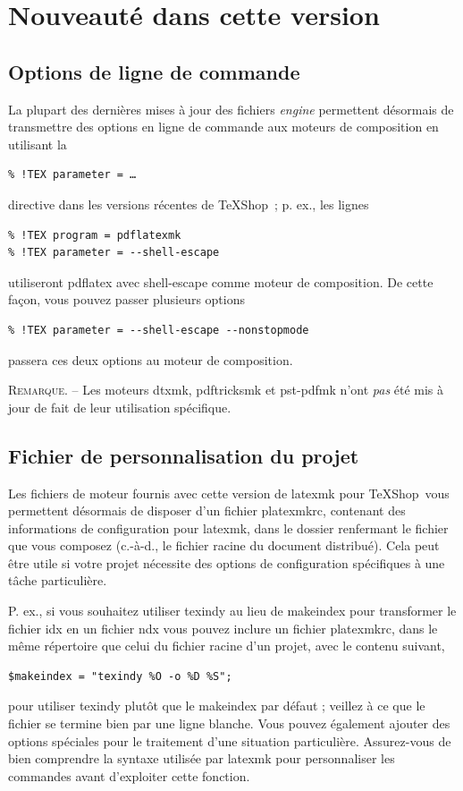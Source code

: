 \documentclass[11pt,french]{article}
\newcommand{\TS}{\textsf{\TeX Shop}}
\newcommand{\cmd}[1]{\textsf{#1}}
\begin{document}
\section{Nouveauté dans cette version} 

\subsection{Options de ligne de commande}\label{sec/CLO}

La plupart des dernières mises à jour des fichiers \emph{engine} permettent désormais de transmettre des options en ligne de commande aux moteurs de composition en utilisant la
\begin{verbatim}
% !TEX parameter = …
\end{verbatim}
directive dans les versions récentes de \TS\ ; p. ex., les lignes 
\begin{verbatim}
% !TEX program = pdflatexmk
% !TEX parameter = --shell-escape
\end{verbatim}
utiliseront \cmd{pdflatex} avec \cmd{shell-escape} comme moteur de composition. De cette façon, vous pouvez passer plusieurs options
\begin{verbatim}
% !TEX parameter = --shell-escape --nonstopmode
\end{verbatim}
passera ces deux options au moteur de composition.

\noindent\textsc{Remarque}. --  Les moteurs \cmd{dtxmk}, \cmd{pdftricksmk} et \cmd{pst-pdfmk} n'ont \emph{pas} été mis à jour de fait de leur utilisation spécifique. 

\subsection{Fichier de personnalisation du projet}

Les fichiers de moteur fournis avec cette version de \cmd{latexmk} pour \TS\ vous permettent désormais de disposer d'un fichier \cmd{platexmkrc}, contenant des informations de configuration pour \cmd{latexmk}, dans le dossier renfermant le fichier que vous composez (c.-à-d., le fichier racine du document distribué). Cela peut être utile si votre projet nécessite des options de configuration spécifiques à une tâche particulière.

P. ex., si vous souhaitez utiliser \cmd{texindy} au lieu de \cmd{makeindex} pour transformer le fichier \cmd{idx} en un fichier \cmd{ndx} vous pouvez inclure un fichier \cmd{platexmkrc}, dans le même répertoire que celui du fichier racine d'un projet, avec le contenu suivant,
\begin{verbatim}
$makeindex = "texindy %O -o %D %S";
\end{verbatim}
pour utiliser \cmd{texindy} plutôt que le \cmd{makeindex} par défaut ; veillez à ce que le fichier se termine bien par une ligne blanche. Vous pouvez également ajouter des options spéciales pour le traitement d'une situation particulière. Assurez-vous de bien comprendre la syntaxe utilisée par \cmd{latexmk} pour personnaliser les commandes avant d'exploiter cette fonction.
\end{document}
